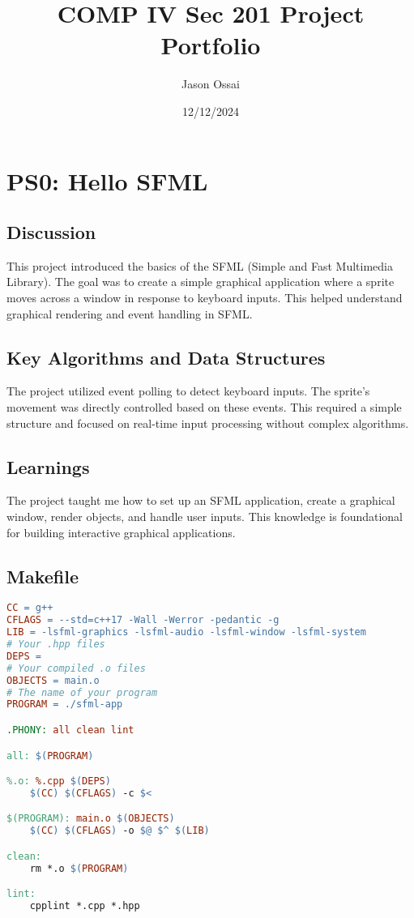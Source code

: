 \documentclass[12pt,a4paper]{article}
\title{COMP IV Sec 201 Project Portfolio}
\author{Jason Ossai}
\date{12/12/2024}
\begin{document}
\maketitle
\newpage
\tableofcontents
\newpage

\section{PS0: Hello SFML}
\subsection{Discussion}
This project introduced the basics of the SFML (Simple and Fast Multimedia Library). The goal was to create a simple graphical application where a sprite moves across a window in response to keyboard inputs. This helped understand graphical rendering and event handling in SFML.

\subsection{Key Algorithms and Data Structures}
The project utilized event polling to detect keyboard inputs. The sprite's movement was directly controlled based on these events. This required a simple structure and focused on real-time input processing without complex algorithms.

\subsection{Learnings}
The project taught me how to set up an SFML application, create a graphical window, render objects, and handle user inputs. This knowledge is foundational for building interactive graphical applications.

\subsection{Makefile}
\begin{lstlisting}[language=make, caption=Makefile for PS0]
CC = g++
CFLAGS = --std=c++17 -Wall -Werror -pedantic -g
LIB = -lsfml-graphics -lsfml-audio -lsfml-window -lsfml-system
# Your .hpp files
DEPS =  
# Your compiled .o files
OBJECTS = main.o 
# The name of your program
PROGRAM = ./sfml-app

.PHONY: all clean lint

all: $(PROGRAM)

%.o: %.cpp $(DEPS)
	$(CC) $(CFLAGS) -c $<

$(PROGRAM): main.o $(OBJECTS)
	$(CC) $(CFLAGS) -o $@ $^ $(LIB)

clean:
	rm *.o $(PROGRAM)

lint:
	cpplint *.cpp *.hpp
\end{lstlisting}
\end{document}
